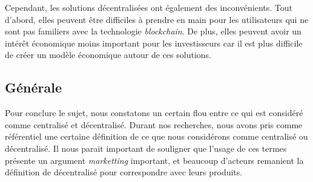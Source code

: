 Cependant, les solutions décentralisées ont également des inconvénients. Tout d’abord, elles peuvent être 
difficiles à prendre en main pour les utilisateurs qui ne sont pas familiers avec la technologie \textit{blockchain}. 
De plus, elles peuvent avoir un intérêt économique moins important pour les investisseurs car il est plus
difficile de créer un modèle économique autour de ces solutions.

\subsection{Générale}
Pour conclure le sujet, nous constatons un certain flou entre ce qui est considéré comme centralisé et décentralisé. 
Durant nos recherches, nous avons pris comme référentiel une certaine définition de ce que nous considérons comme
centralisé ou décentralisé. Il nous parait important de souligner que l'usage de ces termes présente un argument \textit{marketting}
important, et beaucoup d'acteurs remanient la définition de décentralisé pour correspondre avec leurs produits.



